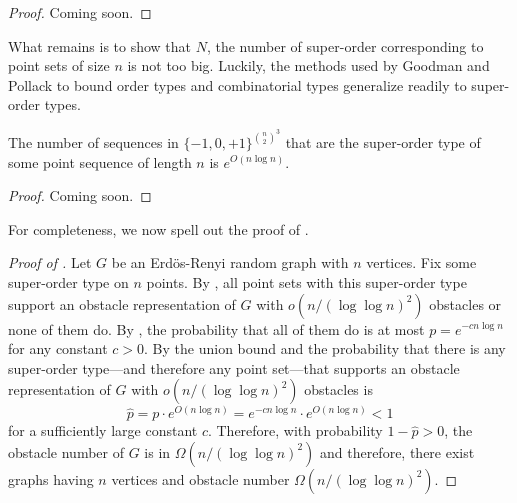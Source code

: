 \documentclass{patmorin}
\begin{document}
\begin{proof}
  Coming soon.
\end{proof}

What remains is to show that $N$, the number of super-order corresponding
to point sets of size $n$ is not too big.  Luckily, the methods used
by Goodman and Pollack to bound order types and combinatorial types
generalize readily to super-order types.

\begin{lem}
  The number of sequences in $\{-1,0,+1\}^{\binom{n}{2}^3}$ that are the
  super-order type of some point sequence of length $n$ is $e^{O(n\log
  n)}$.
\end{lem}

\begin{proof}
   Coming soon.
\end{proof}

For completeness, we now spell out the proof of .

\begin{proof}[Proof of ]
  Let $G$ be an Erd\"os-Renyi random graph with $n$ vertices.  Fix some
  super-order type on $n$ points.  By , all point
  sets with this super-order type support an obstacle representation
  of $G$ with $o(n/(\log\log n)^2)$ obstacles or none of them do.
  By , the probability that all of them do is
  at most $p=e^{-cn\log n}$ for any constant $c>0$.  By the union bound
  and  the probability that there is any
  super-order type---and therefore any point set---that supports an
  obstacle representation of $G$ with $o(n/(\log\log n)^2)$ obstacles is
  \[
     \hat p = p\cdot e^{O(n\log n)} = e^{-cn\log n}\cdot e^{O(n\log n)} < 1
  \]
  for a sufficiently large constant $c$. Therefore, with probability
  $1-\hat p > 0$, the obstacle number of $G$ is in $\Omega(n/(\log\log n)^2)$ and therefore, there
  exist graphs having $n$ vertices and obstacle number
  $\Omega(n/(\log\log n)^2)$.
\end{proof}
\end{document}
